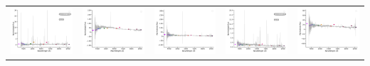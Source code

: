\begin{center}
\begin{longtable}{l l l l l }
    \includegraphics[width=0.19\linewidth, clip]{Figs/Figs-lamost/spec-57313-EG220318S020919M01_sp14-138-STRIPE82-0127-009047.pdf} & \includegraphics[width=0.19\linewidth, clip]{Figs/Figs-lamost/spec-57313-EG220318S020919M01_sp15-081-STRIPE82-0129-009070.pdf} & \includegraphics[width=0.19\linewidth, clip]{Figs/Figs-lamost/spec-57313-EG220318S020919M01_sp15-198-SPLUS-s02s05-026507.pdf} & \includegraphics[width=0.19\linewidth, clip]{Figs/Figs-lamost/spec-57328-EG213118N034906M01_sp01-191-STRIPE82-0120-045064.pdf} & \includegraphics[width=0.19\linewidth, clip]{Figs/Figs-lamost/spec-57336-EG034838N001340M01_sp05-189-STRIPE82-0081-034915.pdf} \\

\end{longtable}
\end{center}
